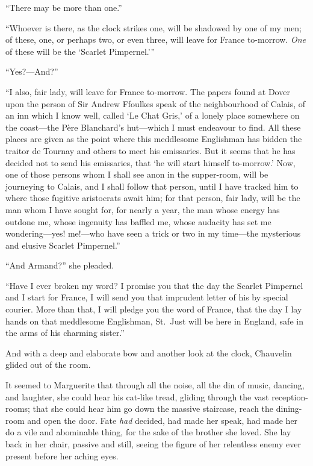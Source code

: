 \documentclass[paper=a5,BCOR=7mm,twoside,DIV=calc,12pt,usegeometry,chapterprefix,endperiod,headings=big]{scrbook}
\begin{document}
\enquote{There may be more than one.}

\enquote{Whoever is there, as the clock strikes one, will be shadowed by one of my men; of these, one, or perhaps two, or even three, will leave for France to-morrow. \textit{One} of these will be the \enquote{Scarlet Pimpernel.}}

\enquote{Yes?---And?}

\enquote{I also, fair lady, will leave for France to-morrow. The papers found at Dover upon the person of Sir Andrew Ffoulkes speak of the neighbourhood of Calais, of an inn which I know well, called \enquote{Le Chat Gris,} of a lonely place somewhere on the coast---the Père Blanchard's hut---which I must endeavour to find. All these places are given as the point where this meddlesome Englishman has bidden the traitor de Tournay and others to meet his emissaries. But it seems that he has decided not to send his emissaries, that \enquote{he will start himself to-morrow.} Now, one of those persons whom I shall see anon in the supper-room, will be journeying to Calais, and I shall follow that person, until I have tracked him to where those fugitive aristocrats await him; for that person, fair lady, will be the man whom I have sought for, for nearly a year, the man whose energy has outdone me, whose ingenuity has baffled me, whose audacity has set me wondering---yes! me!---who have seen a trick or two in my time---the mysterious and elusive Scarlet Pimpernel.}

\enquote{And Armand?} she pleaded.

\enquote{Have I ever broken my word? I promise you that the day the Scarlet Pimpernel and I start for France, I will send you that imprudent letter of his by special courier. More than that, I will pledge you the word of France, that the day I lay hands on that meddlesome Englishman, St.~Just will be here in England, safe in the arms of his charming sister.}

And with a deep and elaborate bow and another look at the clock, Chauvelin glided out of the room.

It seemed to Marguerite that through all the noise, all the din of music, dancing, and laughter, she could hear his cat-like tread, gliding through the vast reception-rooms; that she could hear him go down the massive staircase, reach the dining-room and open the door. Fate \textit{had} decided, had made her speak, had made her do a vile and abominable thing, for the sake of the brother she loved. She lay back in her chair, passive and still, seeing the figure of her relentless enemy ever present before her aching eyes.
\end{document}
